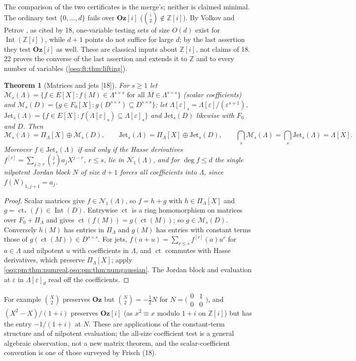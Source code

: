 \documentclass[11pt,letterpaper]{article}
\numberwithin{equation}{section}
\newtheorem{theorem}{Theorem}[section]
\theoremstyle{definition}
\theoremstyle{remark}
\theoremstyle{plain}
\newcommand{\Oz}{\mathbf{Oz}}
\newcommand{\GOz}{\Oz[i]}
\newcommand{\Z}{\mathbb Z}
\newcommand{\ct}{\operatorname{ct}}
\newcommand{\Int}{\operatorname{Int}}
\newcommand{\Num}{\mathscr N}
\newcommand{\src}[1]{\textup{\textsf{[#1]}}}
\begin{document}
The comparison of the two certificates is the merge's; neither is claimed minimal. The ordinary test $\{0,\dots,d\}$ fails over $\GOz$
($\binom i2\notin\Z[i]$). By Volkov and Petrov \cite{VP}, as cited by 18, one-variable testing sets of size $O(d)$ exist for $\Int(\Z[i])$, while
$d+1$ points do not suffice for large $d$; by the last assertion they test $\GOz$ as well. These are classical inputs about $\Z[i]$, not claims of 18.
22 proves the converse of the last assertion and extends it to $\Z$ and to every number of variables (\cref{osq:ft:thm:lifting}).

\begin{theorem}[Matrices and jets \src{18}]\label{osq:or:thm:matrix}
For $s\ge1$ let $\mathcal M_s(\Lambda)=\{f\in E[X]:f(M)\in\Lambda^{s\times s}\text{ for all }M\in\Lambda^{s\times s}\}$ (scalar coefficients) and
$\mathcal M_s(D)=\{g\in F_0[X]:g(D^{s\times s})\subseteq D^{s\times s}\}$; let $\Lambda[\varepsilon]_s=\Lambda[\varepsilon]/(\varepsilon^{s+1})$,
$\mathrm{Jet}_s(\Lambda)=\{f\in E[X]:f(\Lambda[\varepsilon]_s)\subseteq\Lambda[\varepsilon]_s\}$ and $\mathrm{Jet}_s(D)$ likewise with $F_0$ and $D$. Then
\[
 \mathcal M_s(\Lambda)=\Pi_\Lambda[X]\oplus\mathcal M_s(D),\qquad \mathrm{Jet}_s(\Lambda)=\Pi_\Lambda[X]\oplus\mathrm{Jet}_s(D),\qquad
 \bigcap_s\mathcal M_s(\Lambda)=\bigcap_s\mathrm{Jet}_s(\Lambda)=\Lambda[X].
\]
Moreover $f\in\mathrm{Jet}_s(\Lambda)$ if and only if the Hasse derivatives $f^{[r]}=\sum_{j\ge r}\binom jra_jX^{j-r}$, $r\le s$, lie in $\Num_1(\Lambda)$, and for
$\deg f\le d$ the single nilpotent Jordan block $N$ of size $d+1$ forces all coefficients into $\Lambda$, since $f(N)_{1,j+1}=a_j$.
\end{theorem}
\begin{proof}
Scalar matrices give $f\in\Num_1(\Lambda)$, so $f=h+g$ with $h\in\Pi_\Lambda[X]$ and $g=\ct_*(f)\in\Int(D)$. Entrywise $\ct$ is a ring homomorphism on
matrices over $F_0+\Pi_\Lambda$ and gives $\ct(f(M))=g(\ct(M))$; so $g\in\mathcal M_s(D)$. Conversely $h(M)$ has entries in $\Pi_\Lambda$ and $g(M)$ has
entries with constant terms those of $g(\ct(M))\in D^{s\times s}$. For jets, $f(a+u)=\sum_{r\le s}f^{[r]}(a)u^r$ for $a\in\Lambda$ and nilpotent $u$ with
coefficients in $\Lambda$, and $\ct$ commutes with Hasse derivatives, which preserve $\Pi_\Lambda[X]$; apply \cref{osq:pm:thm:numreal,osq:pm:thm:numgaussian}.
The Jordan block and evaluation at $\varepsilon$ in $\Lambda[\varepsilon]_d$ read off the coefficients.
\end{proof}

For example $\binom X2$ preserves $\Oz$ but $\binom N2=-\frac12N$ for $N=\bigl(\begin{smallmatrix}0&1\\0&0\end{smallmatrix}\bigr)$, and
$(X^2-X)/(1+i)$ preserves $\GOz$ (as $x^2\equiv x$ modulo $1+i$ on $\Z[i]$) but has the entry $-1/(1+i)$ at $N$. These are applications of the
constant-term structure and of nilpotent evaluation; the all-size coefficient test is a general algebraic observation, not a new matrix theorem,
and the scalar-coefficient convention is one of those surveyed by Frisch \cite{Frisch} (18).
\end{document}
